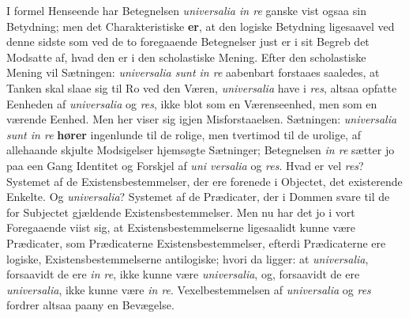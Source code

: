 \documentclass[11pt]{book}
\begin{document}
I formel Henseende har Betegnelsen \textit{universalia in re} ganske
vist ogsaa sin Betydning; men det Charakteristiske \textbf{er}, at den
logiske Betydning ligesaavel ved denne sidste som ved de to
foregaaende Betegnelser just er i sit Begreb det Modsatte af, hvad den
er i den scholastiske Mening. Efter den scholastiske Mening vil
Sætningen: \textit{universalia sunt in re} aabenbart forstaaes
saaledes, at Tanken skal slaae sig til Ro ved den Væren,
\textit{universalia} have i \textit{res}, altsaa opfatte Eenheden af
\textit{universalia} og \textit{res}, ikke blot som en Værenseenhed,
men som en værende Eenhed. Men her viser sig igjen Misforstaaelsen.
Sætningen: \textit{universalia sunt in re} \textbf{hører} ingenlunde
til de rolige, men tvertimod til de urolige, af allehaande skjulte
Modsigelser hjemsøgte Sætninger; Betegnelsen \textit{in re} sætter jo
paa een Gang Identitet og Forskjel af \textit{uni\-%
versalia} og \textit{res}. Hvad er vel \textit{res}? Systemet af de
Existensbestemmelser, der ere forenede i Objectet, det existerende
Enkelte. Og \textit{universalia}? Systemet af de Prædicater, der i
Dommen svare til de for Subjectet gjældende Existensbestemmelser. Men
nu har det jo i vort Foregaaende viist sig, at Existensbestemmelserne
ligesaalidt kunne være Prædicater, som Prædicaterne
Existensbestemmelser, efterdi Prædicaterne ere logiske,
Existensbestemmelserne antilogiske; hvori da ligger: at
\textit{universalia}, forsaavidt de ere \textit{in re}, ikke kunne være
\textit{universalia}, og, forsaavidt de ere \textit{universalia}, ikke
kunne være \textit{in re}. Vexelbestemmelsen af \textit{universalia} og
\textit{res} fordrer altsaa paany en Bevægelse.
\end{document}

